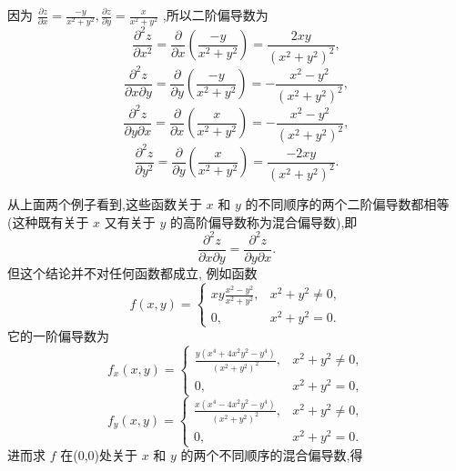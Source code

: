\begin{solution}

\end{solution}
因为 \(\frac{\partial z}{\partial x} = \frac{-y}{{x}^{2} + {y}^{2}},\frac{\partial z}{\partial y} = \frac{x}{{x}^{2} + {y}^{2}}\) ,所以二阶偏导数为
\[
\frac{{\partial }^{2}z}{\partial {x}^{2}} = \frac{\partial }{\partial x}\left( \frac{-y}{{x}^{2} + {y}^{2}}\right)  = \frac{2xy}{{\left( {x}^{2} + {y}^{2}\right) }^{2}},
\]
\[
\frac{{\partial }^{2}z}{\partial x\partial y} = \frac{\partial }{\partial y}\left( \frac{-y}{{x}^{2} + {y}^{2}}\right)  =  - \frac{{x}^{2} - {y}^{2}}{{\left( {x}^{2} + {y}^{2}\right) }^{2}},
\]
\[
\frac{{\partial }^{2}z}{\partial y\partial x} = \frac{\partial }{\partial x}\left( \frac{x}{{x}^{2} + {y}^{2}}\right)  =  - \frac{{x}^{2} - {y}^{2}}{{\left( {x}^{2} + {y}^{2}\right) }^{2}},
\]
\[
\frac{{\partial }^{2}z}{\partial {y}^{2}} = \frac{\partial }{\partial y}\left( \frac{x}{{x}^{2} + {y}^{2}}\right)  = \frac{-{2xy}}{{\left( {x}^{2} + {y}^{2}\right) }^{2}}.
\]
\begin{remark}

\end{remark}
从上面两个例子看到,这些函数关于 \(x\) 和 \(y\) 的不同顺序的两个二阶偏导数都相等 (这种既有关于 \(x\) 又有关于 \(y\) 的高阶偏导数称为混合偏导数),即
\[
\frac{{\partial }^{2}z}{\partial x\partial y} = \frac{{\partial }^{2}z}{\partial y\partial x}.
\]
但这个结论并不对任何函数都成立, 例如函数
\[
f\left( {x,y}\right)  = \left\{  \begin{matrix} {xy}\frac{{x}^{2} - {y}^{2}}{{x}^{2} + {y}^{2}}, & {x}^{2} + {y}^{2} \neq  0, \\  0, & {x}^{2} + {y}^{2} = 0. \end{matrix}\right.
\]
它的一阶偏导数为
\[
{f}_{x}\left( {x,y}\right)  = \left\{  \begin{matrix} \frac{y\left( {{x}^{4} + 4{x}^{2}{y}^{2} - {y}^{4}}\right) }{{\left( {x}^{2} + {y}^{2}\right) }^{2}}, & {x}^{2} + {y}^{2} \neq  0, \\  0, & {x}^{2} + {y}^{2} = 0, \end{matrix}\right.
\]
\[
{f}_{y}\left( {x,y}\right)  = \left\{  \begin{matrix} \frac{x\left( {{x}^{4} - 4{x}^{2}{y}^{2} - {y}^{4}}\right) }{{\left( {x}^{2} + {y}^{2}\right) }^{2}}, & {x}^{2} + {y}^{2} \neq  0, \\  0, & {x}^{2} + {y}^{2} = 0. \end{matrix}\right.
\]
进而求 \(f\) 在(0,0)处关于 \(x\) 和 \(y\) 的两个不同顺序的混合偏导数,得
